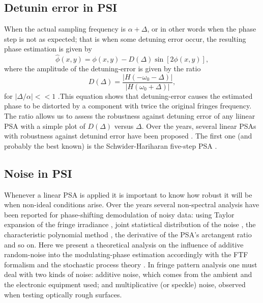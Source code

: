 \subsection{Detunin error in PSI}
When the actual sampling frequency is
$\alpha+\Delta$, or in other words when the phase step is not as expected; 
that is when some detuning error occur, the resulting phase estimation is given by
\begin{equation}
 \hat{\phi}(x,y)=\phi(x,y)-D(\Delta)\sin[2\phi(x,y)],
\end{equation}
where the amplitude of the detuning-error is given by the ratio
\begin{equation}
 D(\Delta)=\frac{|H(-\omega_0-\Delta)|}{|H(\omega_0+\Delta)|},
\end{equation}
for $|\Delta/\alpha|<<1$ \cite{Mosino:09,Mosino:10}.This equation shows that 
detuning-error causes the estimated phase to be distorted by a component with 
twice the original fringes frequency. The ratio allows us to assess the robustness 
against detuning error of any liinear PSA with a simple plot of $D(\Delta)$ versus
$\Delta$. Over the years, several linear PSAs with robustness against detunind 
error have been proposed \cite{Schwider:83,Surrel:93,Surrel:97,Hariharan:87,
Larkin:92,Schmit:95,Schmit:96,Hibino:97,deGroot:95,Bi:04}. The first one (and 
probably the best known) is the Schwider-Hariharan five-step PSA \cite{Schwider:83,
Hariharan:87}.

\subsection{Noise in PSI}
Whenever a linear PSA is applied it is important to know how robust it will be 
when non-ideal conditions arise. Over the years several non-spectral analysis 
have been reported for phase-shifting demodulation of noisy data: using Taylor 
expansion of the fringe irradiance \cite{Brophy:90}, joint
statistical distribution of the noise \cite{Rathjen:95}, the characteristic 
polynomial method \cite{Surrel:97}, the derivative of the PSA's arctangent ratio 
\cite{Hibino:97} and so on. Here we present a theoretical analysis on the 
influence of additive random-noise into the modulating-phase estimation 
accordingly with the FTF formalism and the stochastic process theory 
\cite{Papoulis:2002}.
In fringe pattern analysis one must deal with two kinds of noise: additive
noise, which comes from the ambient and the electronic equipment used; and
multiplicative (or speckle) noise, observed when testing optically rough surfaces.

